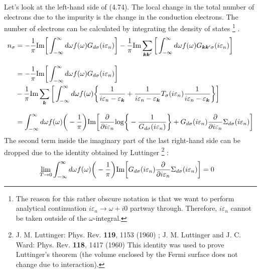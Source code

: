 \documentclass[a4j]{jarticle}
\begin{document}
Let's look at the left-hand side of (4.74).
The local change in the total number of electrons due to the impurity is the change in the conduction electrons.
The number of electrons can be calculated by integrating the density of states
\footnote{
	The reason for this rather obscure notation is that we want to perform analytical continuation $i \varepsilon_{n} \to \omega + i0$ partway through.
	Therefore, $i \varepsilon_{n}$ cannot be taken outside of the $\omega$-integral.
}
.
\begin{align}
	n_{\sigma}
	 & =
	-
	\frac{1}{\pi}
	{\rm Im}
	\bigg[
		\int^{\infty}_{-\infty}
		d \omega
		f(\omega)
		G_{d \sigma}(i \varepsilon_{n})
		\bigg]
	-
	\frac{1}{\pi}
	{\rm Im}
	\sum_{\bm{k} \bm{k}'}
	\bigg[
		\int^{\infty}_{-\infty}
		d \omega
		f(\omega)
		G_{\bm{k} \bm{k}' \sigma}(i \varepsilon_{n})
		\bigg]
	\nonumber \\[3mm] &=
	-
	\frac{1}{\pi}
	{\rm Im}
	\bigg[
		\int^{\infty}_{-\infty}
		d \omega
		f(\omega)
		G_{d \sigma}(i \varepsilon_{n})
		\bigg]
	\nonumber \\ &
	-
	\frac{1}{\pi}
	{\rm Im}
	\sum_{\bm{k}}
	\bigg[
		\int^{\infty}_{-\infty}
		d \omega
		f(\omega)
		\bigg\{
		\frac{1}{
			i \varepsilon_{n} - \varepsilon_{\bm{k}}
		}
		+
		\frac{1}{
			i \varepsilon_{n} - \varepsilon_{\bm{k}}
		}
		T_{\sigma}(i \varepsilon_{n})
		\frac{1}{
			i \varepsilon_{n} - \varepsilon_{\bm{k}}
		}
		\bigg\}
		\bigg]
	\nonumber \\[3mm] &=
	\int^{\infty}_{-\infty}
	d \omega
	f(\omega)
	\bigg(- \frac{1}{\pi} \bigg)
	{\rm Im}
	\bigg[
		\frac{\partial}{\partial i \varepsilon_{n}}
		{\rm log}
		\bigg\{
		- \frac{1}{G_{d \sigma}(i \varepsilon_{n})}
		\bigg\}
		+
		G_{d \sigma}(i \varepsilon_{n})
		\frac{\partial}{\partial i \varepsilon_{n}}
		\Sigma_{d \sigma}(i \varepsilon_{n})
		\bigg]
\end{align}
The second term inside the imaginary part of the last right-hand side can be dropped due to the identity obtained by Luttinger
\footnote{
	J. M. Luttinger: Phys. Rev. {\bf 119}, 1153 (1960) ;
	J. M. Luttinger and J. C. Ward: Phys. Rev. {\bf 118}, 1417 (1960)
	\hspace{3mm}
	This identity was used to prove Luttinger's theorem (the volume enclosed by the Fermi surface does not change due to interaction).
}
:
\begin{align}
	\lim_{T \to 0}
	\int^{\infty}_{-\infty}
	d \omega
	f(\omega)
	\bigg(- \frac{1}{\pi} \bigg)
	{\rm Im}
	\bigg[
		G_{d \sigma}(i \varepsilon_{n})
		\frac{\partial}{\partial i \varepsilon_{n}}
		\Sigma_{d \sigma}(i \varepsilon_{n})
		\bigg]
	 & =
	0
\end{align}
\end{document}
